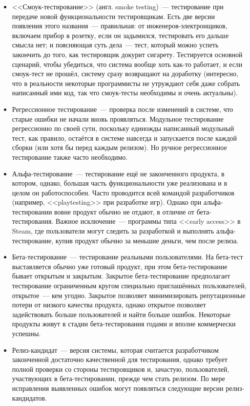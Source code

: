 \documentclass{../../text-style}
\begin{document}
\begin{itemize}
    \item <<Смоук-тестирование>> (англ. smoke testing)~--- тестирование при передаче новой функциональности тестировщикам. Есть две версии появления этого названия~--- правильная: от инженеров-электронщиков, включаем прибор в розетку, если он задымился, тестировать его дальше смысла нет; и поясняющая суть дела~--- тест, который можно успеть закончить до того, как тестировщик докурит сигарету. Тестируется основной сценарий, чтобы убедиться, что система вообще хоть как-то работает, и если смоук-тест не прошёл, систему сразу возвращают на доработку (интересно, что в реальности некоторые программисты не утруждают себя даже собрать написанный ими код, так что смоук-тесты необходимы и очень актуальны).
    \item Регрессионное тестирование~--- проверка после изменений в системе, что старые ошибки не начали вновь проявляться. Модульное тестирование регрессионно по своей сути, поскольку единожды написанный модульный тест, как правило, остаётся в системе навсегда и запускается после каждой сборки (или хотя бы перед каждым релизом). Но ручное регрессионное тестирование также часто необходимо.
    \item Альфа-тестирование~--- тестирование ещё не законченного продукта, в котором, однако, большая часть функциональности уже реализована и в целом он работоспособен. Часто проводится всей командой разработчиков (например, <<playtesting>> при разработке игр). Однако при альфа-тестировании вовне продукт обычно не отдают, в отличие от бета-тестирования. Важное исключение~--- программы типа <<early access>> в Steam, где пользователи могут следить за разработкой и выполнять альфа-тестирование, купив продукт обычно за меньшие деньги, чем после релиза.
    \item Бета-тестирование~--- тестирование реальными пользователями. На бета-тест выставляется обычно уже готовый продукт, при этом бета-тестирование бывает открытым и закрытым. Закрытое бета-тестирование предполагает тестирование ограниченным кругом специально приглашённых пользователей, открытое~--- кем угодно. Закрытое позволяет минимизировать репутационные потери от низкого качества продукта, однако открытое позволяет задействовать больше пользователей и найти больше ошибок. Некоторые продукты живут в стадии бета-тестирования годами и вполне коммерчески успешны.
    \item Релиз-кандидат~--- версия системы, которая считается разработчиком законченной достаточно качественной для тестирования, однако требует полной проверки со стороны тестировщиков и, зачастую, пользователей, участвующих в бета-тестировании, прежде чем стать релизом. По мере исправления выявленных ошибок могут появляться следующие версии релиз-кандидатов.
\end{itemize}
\end{document}
